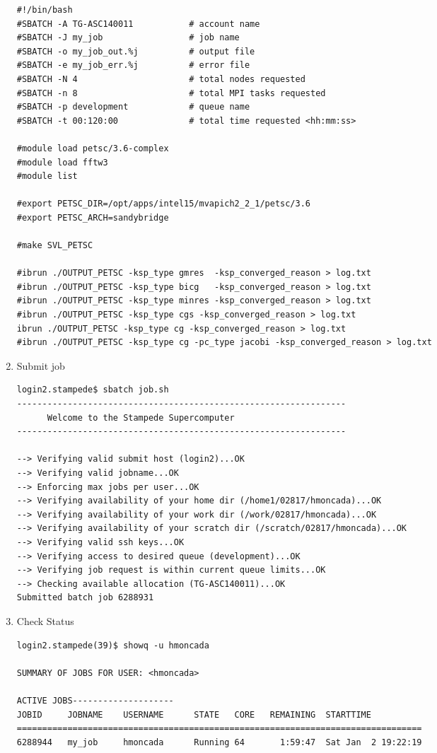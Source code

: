 \documentclass{article}
\begin{document}
\begin{enumerate}
\begin{verbatim}
#!/bin/bash
#SBATCH -A TG-ASC140011           # account name
#SBATCH -J my_job                 # job name
#SBATCH -o my_job_out.%j          # output file
#SBATCH -e my_job_err.%j          # error file
#SBATCH -N 4                      # total nodes requested
#SBATCH -n 8                      # total MPI tasks requested
#SBATCH -p development            # queue name
#SBATCH -t 00:120:00              # total time requested <hh:mm:ss>

#module load petsc/3.6-complex
#module load fftw3
#module list

#export PETSC_DIR=/opt/apps/intel15/mvapich2_2_1/petsc/3.6
#export PETSC_ARCH=sandybridge

#make SVL_PETSC

#ibrun ./OUTPUT_PETSC -ksp_type gmres  -ksp_converged_reason > log.txt
#ibrun ./OUTPUT_PETSC -ksp_type bicg   -ksp_converged_reason > log.txt
#ibrun ./OUTPUT_PETSC -ksp_type minres -ksp_converged_reason > log.txt
#ibrun ./OUTPUT_PETSC -ksp_type cgs -ksp_converged_reason > log.txt
ibrun ./OUTPUT_PETSC -ksp_type cg -ksp_converged_reason > log.txt
#ibrun ./OUTPUT_PETSC -ksp_type cg -pc_type jacobi -ksp_converged_reason > log.txt
\end{verbatim}
\normalsize
\item Submit job
\scriptsize
\begin{verbatim}
login2.stampede$ sbatch job.sh
-----------------------------------------------------------------
      Welcome to the Stampede Supercomputer              
-----------------------------------------------------------------

--> Verifying valid submit host (login2)...OK
--> Verifying valid jobname...OK
--> Enforcing max jobs per user...OK
--> Verifying availability of your home dir (/home1/02817/hmoncada)...OK
--> Verifying availability of your work dir (/work/02817/hmoncada)...OK
--> Verifying availability of your scratch dir (/scratch/02817/hmoncada)...OK
--> Verifying valid ssh keys...OK
--> Verifying access to desired queue (development)...OK
--> Verifying job request is within current queue limits...OK
--> Checking available allocation (TG-ASC140011)...OK
Submitted batch job 6288931
\end{verbatim}
\normalsize
\item Check Status
\scriptsize
\begin{verbatim}
login2.stampede(39)$ showq -u hmoncada

SUMMARY OF JOBS FOR USER: <hmoncada>

ACTIVE JOBS--------------------
JOBID     JOBNAME    USERNAME      STATE   CORE   REMAINING  STARTTIME
================================================================================
6288944   my_job     hmoncada      Running 64       1:59:47  Sat Jan  2 19:22:19


\end{verbatim}
\end{enumerate}
\end{document}
